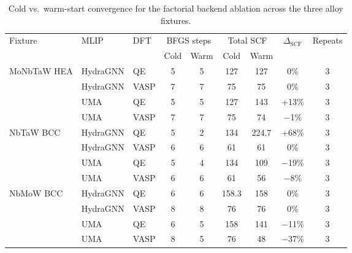 \documentclass[conference]{IEEEtran}
\def\acs#1{#1}%
\begin{document}
\begin{table}[t]
\centering
\caption{Cold vs.\ warm-start convergence for the factorial backend ablation
across the three alloy fixtures.}
\label{tab:warmstart_matrix}
\begin{tabular}{lllcccccc}
\toprule
\multirow{2}{*}{Fixture} & \multirow{2}{*}{\acs{MLIP}} & \multirow{2}{*}{\acs{DFT}}
 & \multicolumn{2}{c}{\acs{BFGS} steps} & \multicolumn{2}{c}{Total \acs{SCF}} & \multirow{2}{*}{$\Delta_\text{SCF}$} & \multirow{2}{*}{Repeats}\\
\cmidrule(lr){4-5}\cmidrule(lr){6-7}
 & & & Cold & Warm & Cold & Warm & & \\
\midrule
\multirow{4}{*}{MoNbTaW \acs{HEA}} & HydraGNN & \acs{QE} & 5 & 5 & 127 & 127 & 0\% & 3 \\
 & HydraGNN & \acs{VASP} & 7 & 7 & 75 & 75 & 0\% & 3 \\
 & UMA & \acs{QE} & 5 & 5 & 127 & 143 & +13\% & 3 \\
 & UMA & \acs{VASP} & 7 & 7 & 75 & 74 & $-$1\% & 3 \\
\cmidrule(lr){1-9}
\multirow{4}{*}{NbTaW BCC} & HydraGNN & \acs{QE} & 5 & 2 & 134 & 224.7 & +68\% & 3 \\
 & HydraGNN & \acs{VASP} & 6 & 6 & 61 & 61 & 0\% & 3 \\
 & UMA & \acs{QE} & 5 & 4 & 134 & 109 & $-$19\% & 3 \\
 & UMA & \acs{VASP} & 6 & 6 & 61 & 56 & $-$8\% & 3 \\
\cmidrule(lr){1-9}
\multirow{4}{*}{NbMoW BCC} & HydraGNN & \acs{QE} & 6 & 6 & 158.3 & 158 & 0\% & 3 \\
 & HydraGNN & \acs{VASP} & 8 & 8 & 76 & 76 & 0\% & 3 \\
 & UMA & \acs{QE} & 6 & 5 & 158 & 141 & $-$11\% & 3 \\
 & UMA & \acs{VASP} & 8 & 5 & 76 & 48 & $-$37\% & 3 \\
\bottomrule
\end{tabular}
\end{table}
\end{document}
